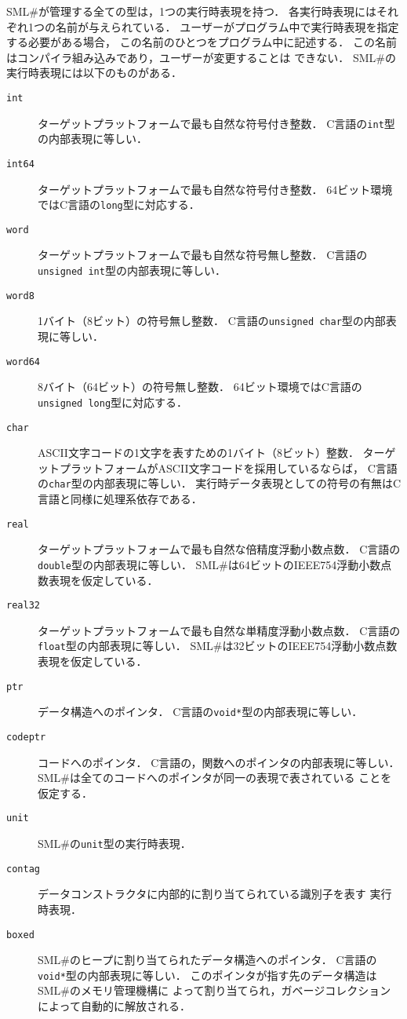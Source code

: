 \documentclass{jbook}
\newcommand{\smlsharp}{SML\#}
\begin{document}
	\smlsharp{}が管理する全ての型は，1つの実行時表現を持つ．
	各実行時表現にはそれぞれ1つの名前が与えられている．
	ユーザーがプログラム中で実行時表現を指定する必要がある場合，
この名前のひとつをプログラム中に記述する．
	この名前はコンパイラ組み込みであり，ユーザーが変更することは
できない．
	\smlsharp{}の実行時表現には以下のものがある．
\begin{description}
\item[{\tt int}]
	ターゲットプラットフォームで最も自然な符号付き整数．
	C言語の{\tt int}型の内部表現に等しい．
\item[{\tt int64}]
	ターゲットプラットフォームで最も自然な符号付き整数．
	64ビット環境ではC言語の{\tt long}型に対応する．
\item[{\tt word}]
	ターゲットプラットフォームで最も自然な符号無し整数．
	C言語の{\tt unsigned int}型の内部表現に等しい．
\item[{\tt word8}]
	1バイト（8ビット）の符号無し整数．
	C言語の{\tt unsigned char}型の内部表現に等しい．
\item[{\tt word64}]
	8バイト（64ビット）の符号無し整数．
	64ビット環境ではC言語の{\tt unsigned long}型に対応する．
\item[{\tt char}]
	ASCII文字コードの1文字を表すための1バイト（8ビット）整数．
	ターゲットプラットフォームがASCII文字コードを採用しているならば，
C言語の{\tt char}型の内部表現に等しい．
	実行時データ表現としての符号の有無はC言語と同様に処理系依存である．
\item[{\tt real}]
	ターゲットプラットフォームで最も自然な倍精度浮動小数点数．
	C言語の{\tt double}型の内部表現に等しい．
	\smlsharp{}は64ビットのIEEE754浮動小数点数表現を仮定している．
\item[{\tt real32}]
	ターゲットプラットフォームで最も自然な単精度浮動小数点数．
	C言語の{\tt float}型の内部表現に等しい．
	\smlsharp{}は32ビットのIEEE754浮動小数点数表現を仮定している．
\item[{\tt ptr}]
	データ構造へのポインタ．
	C言語の{\tt void*}型の内部表現に等しい．
\item[{\tt codeptr}]
	コードへのポインタ．
	C言語の，関数へのポインタの内部表現に等しい．
        \smlsharp{}は全てのコードへのポインタが同一の表現で表されている
ことを仮定する．
\item[{\tt unit}]
	\smlsharp{}の{\tt unit}型の実行時表現．
\item[{\tt contag}]
	データコンストラクタに内部的に割り当てられている識別子を表す
実行時表現．
\item[{\tt boxed}]
	\smlsharp{}のヒープに割り当てられたデータ構造へのポインタ．
	C言語の{\tt void*}型の内部表現に等しい．
	このポインタが指す先のデータ構造は\smlsharp{}のメモリ管理機構に
よって割り当てられ，ガベージコレクションによって自動的に解放される．
\end{description}
\end{document}
